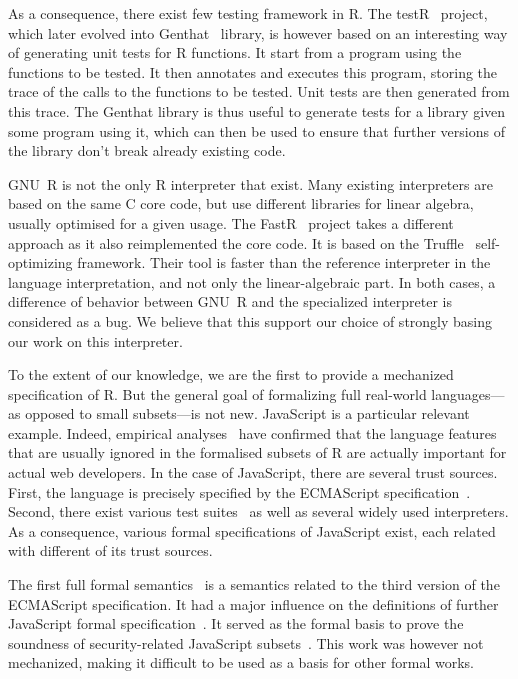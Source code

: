 \documentclass[
    sigplan,
    10pt,
    review, %
    natbib=false %
 ]{acmart}
\begin{document}
As a consequence,
there exist few testing framework in R.
The testR~\parencite{maj2013testr, 2014testr} project,
which later evolved into Genthat~\parencite{genthat} library,
is however based on an interesting way of generating unit tests for R functions.
It start from a program using the functions to be tested.
It then annotates and executes this program,
storing the trace of the calls to the functions to be tested.
Unit tests are then generated from this trace.
The Genthat library is thus useful to generate tests for a library
given some program using it,
which can then be used to ensure that further versions of the library
don't break already existing code.

GNU~R is not the only R interpreter that exist.
Many existing interpreters are based on the same C core code,
but use different libraries for linear algebra,
usually optimised for a given usage.
%
The FastR~\parencite{kalibera2014fast} project takes a different approach
as it also reimplemented the core code.
It is based on the Truffle~\parencite{wuerthingertruffle}
self-optimizing framework.
Their tool is faster than the reference interpreter
in the language interpretation, and not only the linear-algebraic part.
%
In both cases, a difference of behavior between GNU~R
and the specialized interpreter is considered as a bug.
We believe that this support our choice of strongly basing
our work on this interpreter.

To the extent of our knowledge,
we are the first to provide a mechanized specification of R.
But the general goal of formalizing full real-world languages—%
as opposed to small subsets—is not new.
%
JavaScript is a particular relevant example.
Indeed, empirical analyses~\parencite{RichardsHBV11}
have confirmed that the language features
that are usually ignored in the formalised subsets of R
are actually important for actual web developers.
%
In the case of JavaScript, there are several trust sources.
First, the language is precisely specified by the ECMAScript specification~\parencite{es2019}.
Second, there exist various test suites~\parencite{test262, mozillatests}
as well as several widely used interpreters.
As a consequence, various formal specifications of JavaScript exist,
each related with different of its trust sources.

The first full formal semantics~\parencite{aplas08}
is a semantics related to the third version of the ECMAScript specification.
It had a major influence on the definitions of further JavaScript formal
specification~\parencite{ses, jscert, popl12-Towards, usenix}.
It served as the formal basis to prove the soundness of security-related
JavaScript subsets~\parencite{MMT-CSF-TR09, mmt-esorics09, mmt-oakland10}.
This work was however not mechanized, making it difficult to be used
as a basis for other formal works.
\end{document}
